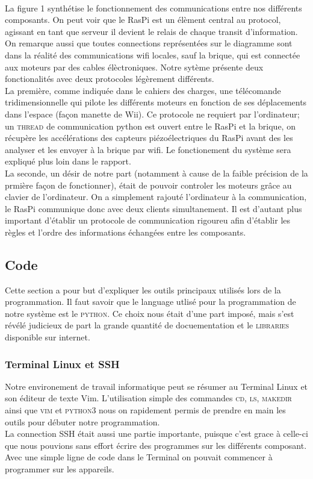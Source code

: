 \documentclass[twoside,twocolumn, 16pt]{article}
\begin{document}
\paragraph{} \indent La figure 1 synthétise le fonctionnement des communications entre nos différents composants. On peut voir que le RasPi est un élèment central au protocol, agissant en tant que serveur il devient le relais de chaque transit d'information. On remarque aussi que toutes connections représentées sur le diagramme sont dans la réalité des communications wifi locales, sauf la brique, qui est connectée aux moteurs par des cables élèctroniques. Notre sytème présente deux fonctionalités avec deux protocoles légèrement différents. \\
\indent La première, comme indiquée dans le cahiers des charges, une télécomande tridimensionnelle qui pilote les différents moteurs en fonction de ses déplacements dans l'espace (façon manette de Wii). Ce protocole ne requiert par l'ordinateur; un \textsc{thread} de communication python est ouvert entre le RasPi et la brique, on récupère les accélérations des capteurs piézoélectriques du RasPi avant des les analyser et les envoyer à la brique par wifi. Le fonctionement du système sera expliqué plus loin dans le rapport. \\ 
\indent La seconde, un désir de notre part (notamment à cause de la faible précision de la prmière façon de fonctionner), était de pouvoir controler les moteurs grâce au clavier de l'ordinateur. On a simplement rajouté l'ordinateur à la communication, le RasPi communique donc avec deux clients simultanement. Il est d'autant plus important d'établir un protocole de communication rigoureu afin d'établir les règles et l'ordre des informations échangées entre les composants.


\subsection{Code}
Cette section a pour but d'expliquer les outils principaux utilisés lors de la programmation. Il faut savoir que le language utlisé pour la programmation de notre système est le \textsc{python}. Ce choix nous était d'une part imposé, mais s'est révélé judicieux de part la grande quantité de docuementation et le \textsc{libraries} disponible sur internet.\\
\subsubsection{Terminal Linux et SSH}
Notre environement de travail informatique peut se résumer au Terminal Linux et son éditeur de texte Vim. L'utilisation simple des commandes \textsc{cd, ls, makedir} ainsi que \textsc{vim} et \textsc{python3} nous on rapidement permis de prendre en main les outils pour débuter notre programmation. \\
\indent La connection SSH était aussi une partie importante, puisque c'est grace à celle-ci que nous pouvions sans effort écrire des programmes sur les différents composant. Avec une simple ligne de code dans le Terminal on pouvait commencer à programmer sur les appareils.
\end{document}
